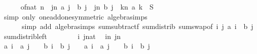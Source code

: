 \begin{isabellebody}
\ \ \isamarkupfalse%
\ {\isachardoublequoteopen}{}\ {\isacharasterisk}{\kern0pt}\ {\isacharparenleft}{\kern0pt}of{\isacharunderscore}{\kern0pt}nat\ n\ {\isacharasterisk}{\kern0pt}\ {\isacharparenleft}{\kern0pt}{\isasymSum}j{\isacharequal}{\kern0pt}{}{\isachardot}{\kern0pt}{\isachardot}{\kern0pt}{\isacharless}{\kern0pt}n{\isachardot}{\kern0pt}\ {\isacharparenleft}{\kern0pt}a\ j\ {\isacharasterisk}{\kern0pt}\ b\ j{\isacharparenright}{\kern0pt}{\isacharparenright}{\kern0pt}\ {\isacharminus}{\kern0pt}\ {\isacharparenleft}{\kern0pt}{\isasymSum}j{\isacharequal}{\kern0pt}{}{\isachardot}{\kern0pt}{\isachardot}{\kern0pt}{\isacharless}{\kern0pt}n{\isachardot}{\kern0pt}\ b\ j{\isacharparenright}{\kern0pt}\ {\isacharasterisk}{\kern0pt}\ {\isacharparenleft}{\kern0pt}{\isasymSum}k{\isacharequal}{\kern0pt}{}{\isachardot}{\kern0pt}{\isachardot}{\kern0pt}{\isacharless}{\kern0pt}n{\isachardot}{\kern0pt}\ a\ k{\isacharparenright}{\kern0pt}{\isacharparenright}{\kern0pt}\ {\isacharequal}{\kern0pt}\ {\isacharquery}{\kern0pt}S{\isachardoublequoteclose}\isanewline
\ \ \ \ \isamarkupfalse%
\ {\isacharparenleft}{\kern0pt}simp\ only{\isacharcolon}{\kern0pt}\ one{\isacharunderscore}{\kern0pt}add{\isacharunderscore}{\kern0pt}one{\isacharbrackleft}{\kern0pt}symmetric{\isacharbrackright}{\kern0pt}\ algebra{\isacharunderscore}{\kern0pt}simps{\isacharparenright}{\kern0pt}\isanewline
\ \ \ \ \ \ {\isacharparenleft}{\kern0pt}simp\ add{\isacharcolon}{\kern0pt}\ algebra{\isacharunderscore}{\kern0pt}simps\ sum{\isacharunderscore}{\kern0pt}subtractf\ sum{\isachardot}{\kern0pt}distrib\ sum{\isachardot}{\kern0pt}swap{\isacharbrackleft}{\kern0pt}of\ {\isachardoublequoteopen}{\isasymlambda}i\ j{\isachardot}{\kern0pt}\ a\ i\ {\isacharasterisk}{\kern0pt}\ b\ j{\isachardoublequoteclose}{\isacharbrackright}{\kern0pt}\ sum{\isacharunderscore}{\kern0pt}distrib{\isacharunderscore}{\kern0pt}left{\isacharparenright}{\kern0pt}\isanewline
\ \ \isamarkupfalse%
\isanewline
\ \ \isacommand{{\isacharbraceleft}{\kern0pt}}\isamarkupfalse%
\ \isamarkupfalse%
\ i\ j{\isacharcolon}{\kern0pt}{\isacharcolon}{\kern0pt}nat\ \isamarkupfalse%
\ {\isachardoublequoteopen}i{\isacharless}{\kern0pt}n{\isachardoublequoteclose}\ {\isachardoublequoteopen}j{\isacharless}{\kern0pt}n{\isachardoublequoteclose}\isanewline
\ \ \ \ \isamarkupfalse%
\ {\isachardoublequoteopen}a\ i\ {\isacharminus}{\kern0pt}\ a\ j\ {\isasymle}\ {}\ {\isasymand}\ b\ i\ {\isacharminus}{\kern0pt}\ b\ j\ {\isasymge}\ {}\ {\isasymor}\ a\ i\ {\isacharminus}{\kern0pt}\ a\ j\ {\isasymge}\ {}\ {\isasymand}\ b\ i\ {\isacharminus}{\kern0pt}\ b\ j\ {\isasymle}\ {}{\isachardoublequoteclose}\isanewline

\end{isabellebody}
